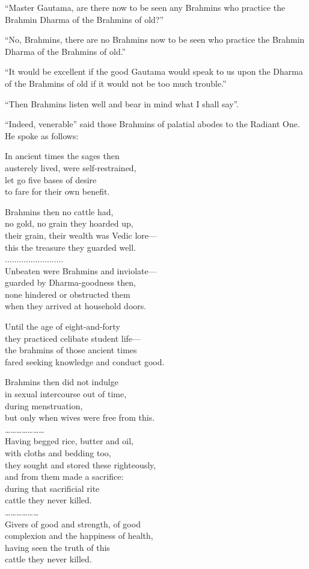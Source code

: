 “Master Gautama, are there now to be seen any Brahmins who practice the Brahmin Dharma of the Brahmins of old?”

“No, Brahmins, there are no Brahmins now to be seen who practice the Brahmin Dharma of the Brahmins of old.”

“It would be excellent if the good Gautama would speak to us upon the Dharma of the Brahmins of old if it would not be too much trouble.”

“Then Brahmins listen well and bear in mind what I shall say”.

“Indeed, venerable” said those Brahmins of palatial abodes to the Radiant One. He spoke as follows:

In ancient times the sages then\\ austerely lived, were self-restrained,\\ let go five bases of desire\\ to fare for their own benefit.

Brahmins then no cattle had,\\ no gold, no grain they hoarded up,\\ their grain, their wealth was Vedic lore—\\ this the treasure they guarded well.\\.........................\\ Unbeaten were Brahmins and inviolate—\\ guarded by Dharma-goodness then,\\ none hindered or obstructed them\\ when they arrived at household doors.

Until the age of eight-and-forty\\ they practiced celibate student life—\\ the brahmins of those ancient times\\ fared seeking knowledge and conduct good.

Brahmins then did not indulge\\ in sexual intercourse out of time,\\ during menstruation,\\ but only when wives were free from this.\\ …………………\\ Having begged rice, butter and oil,\\ with cloths and bedding too,\\ they sought and stored these righteously,\\ and from them made a sacrifice:\\ during that sacrificial rite\\ cattle they never killed.\\ ………………\\ Givers of good and strength, of good\\ complexion and the happiness of health,\\ having seen the truth of this\\ cattle they never killed.

